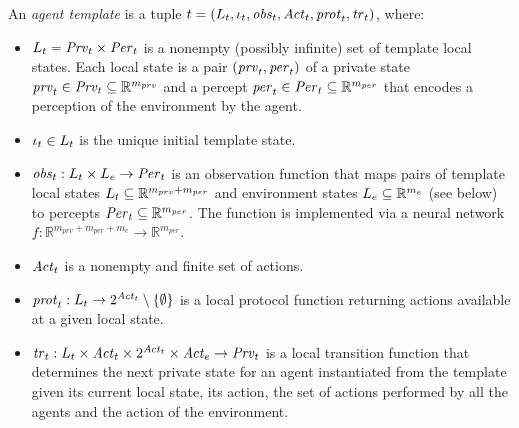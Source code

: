 \begin{definition}
An {\em agent template} is a tuple ${t} = \left ( L_{t}, \iota_{t}, \mathit{obs}_{t},
\mathit{Act}_{t}, \mathit{prot}_{t}, \mathit{tr}_{t}  \right )$, where:
\begin{itemize}[$\bullet$]\itemsep 0cm
  \item $L_{t} = \mathit{Prv}_{t} \times \mathit{Per}_{t}$ is a nonempty (possibly infinite)
  set of template local states.  Each local state  is a pair $\left ( \mathit{prv}_{t}, \mathit{per}_{t} \right )$ of
  a private state $\mathit{prv}_{t} \in \mathit{Prv}_{t} \subseteq \mathbb R^{m_{prv}}$ and a
  percept $\mathit{per}_{t} \in \mathit{Per}_{t} \subseteq \mathbb R^{m_{per}}$ that encodes a
  perception of the environment by the agent.  

  \item $\iota_{t} \in L_{t}$ is the unique initial template state.
  
  \item $\mathit{obs}_{t} : L_{t} \times L_{e} \rightarrow \mathit{Per}_{t}$ is an
  observation function that maps pairs of template local states $L_{t}
  \subseteq \mathbb{R}^{m_{prv} + m_{per}}$ and environment states $L_{e}
  \subseteq \mathbb{R}^{m_e}$ (see below) to percepts $\mathit{Per}_{t} \subseteq
  \mathbb{R}^{m_{per}}$. The function is implemented via a neural
  network $f : \mathbb{R}^{m_{prv} + m_{per} + m_e} \rightarrow
  \mathbb{R}^{m_{per}}$.

  \item $\mathit{Act}_{t}$ is a nonempty and finite set of actions.
  
  \item
    $\mathit{prot}_{t} : L_{t} \rightarrow 2^{\mathit{Act}_{t}} \setminus \left \{ \emptyset \right \}$ is
    a local protocol function returning actions available at a given local
    state.

  \item $\mathit{tr}_{t}: L_{t} \times \mathit{Act}_{t} \times 2^{\mathit{Act}_{t}} \times \mathit{Act}_{e} 
  \rightarrow \mathit{Prv}_{t}$ is a local transition function  that determines the next
  private state for an agent instantiated from the template given its current local state, its action, 
  the set of actions performed by all the agents  and the action of the
  environment.
  
\end{itemize}  
\end{definition}



